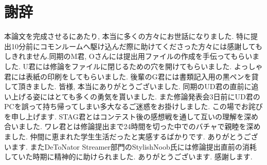 \documentclass[Main]{subfiles}
\begin{document}
\section*{謝辞}

本論文を完成させるにあたり, 本当に多くの方々にお世話になりました. 特に提出10分前にコモンルームへ駆け込んだ際に助けてくださった方々には感謝してもしきれません.同期のM君, Oさんには提出用ファイルの作成を手伝ってもらいました. U君には修論をファイルに閉じるための穴を開けてもらいました. よっしゃ君には表紙の印刷をしてもらいました. 後輩のG君には書類記入用の黒ペンを貸して頂きました. 皆様, 本当にありがとうございました.
同期のUD君の直前に追い上げる姿にはとても多くの勇気を貰いました. また修論発表会3日前にUD君のPCを誤って持ち帰ってしまい多大なるご迷惑をお掛けしました. この場でお詫びを申し上げます. STAG君とはコンテスト後の感想戦を通して互いの理解を深め合いました. ワレ君とは修論提出まで24時間を切った中でのバチャで親睦を深めました. 仲間に恵まれた学生生活だったと実感するばかりです. ありがとうございます.
またDeToNator Streamer部門のStylishNoob氏には修論提出直前の消耗していた時期に精神的に助けられました. ありがとうございます. 感謝します.
\end{document}
